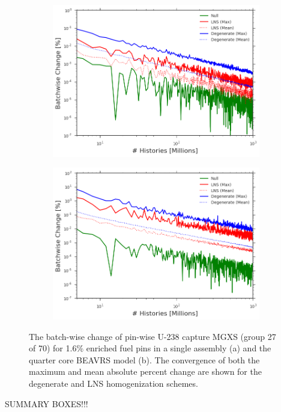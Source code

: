 \begin{figure}[h!]
\centering
\begin{subfigure}{.87\textwidth}
  \centering
  \includegraphics[width=\linewidth]{figures/patterns/convergence/assm-16/assm-16-capt}
  \caption{}
  \label{fig:chap9-assm-16-converge}
\end{subfigure}
\begin{subfigure}{.87\textwidth}
  \centering
  \includegraphics[width=\linewidth]{figures/patterns/convergence/full-core/16-enr-capt}
  \caption{}
  \label{fig:chap9-reflector-converge}
\end{subfigure}
\caption[Convergence of pin-wise U-238 capture MGXS]{The batch-wise change of pin-wise U-238 capture \ac{MGXS} (group 27 of 70) for 1.6\% enriched fuel pins in a single assembly (a) and the quarter core \ac{BEAVRS} model (b). The convergence of both the maximum and mean absolute percent change are shown for the degenerate and \ac{LNS} homogenization schemes.}
\label{fig:chap9-converge}
\end{figure}


SUMMARY BOXES!!!
